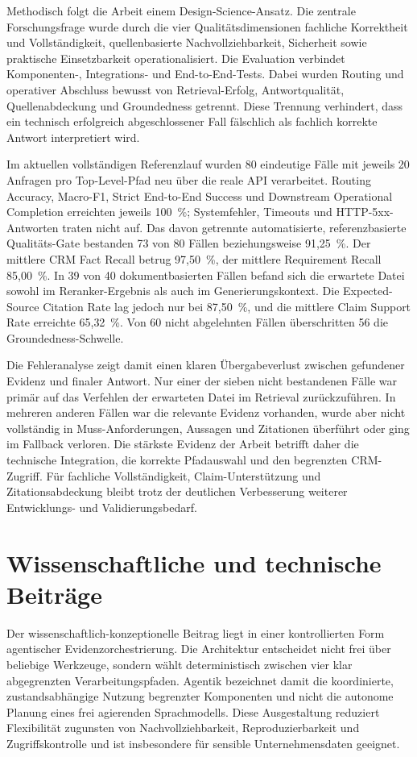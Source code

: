 Methodisch folgt die Arbeit einem Design-Science-Ansatz. Die zentrale Forschungsfrage wurde durch die vier Qualitätsdimensionen fachliche Korrektheit und Vollständigkeit, quellenbasierte Nachvollziehbarkeit, Sicherheit sowie praktische Einsetzbarkeit operationalisiert. Die Evaluation verbindet Komponenten-, Integrations- und End-to-End-Tests. Dabei wurden Routing und operativer Abschluss bewusst von Retrieval-Erfolg, Antwortqualität, Quellenabdeckung und Groundedness getrennt. Diese Trennung verhindert, dass ein technisch erfolgreich abgeschlossener Fall fälschlich als fachlich korrekte Antwort interpretiert wird.

Im aktuellen vollständigen Referenzlauf wurden 80 eindeutige Fälle mit jeweils 20 Anfragen pro Top-Level-Pfad neu über die reale API verarbeitet. Routing Accuracy, Macro-F1, Strict End-to-End Success und Downstream Operational Completion erreichten jeweils 100~\%; Systemfehler, Timeouts und HTTP-5xx-Antworten traten nicht auf. Das davon getrennte automatisierte, referenzbasierte Qualitäts-Gate bestanden 73 von 80 Fällen beziehungsweise 91{,}25~\%. Der mittlere CRM Fact Recall betrug 97{,}50~\%, der mittlere Requirement Recall 85{,}00~\%. In 39 von 40 dokumentbasierten Fällen befand sich die erwartete Datei sowohl im Reranker-Ergebnis als auch im Generierungskontext. Die Expected-Source Citation Rate lag jedoch nur bei 87{,}50~\%, und die mittlere Claim Support Rate erreichte 65{,}32~\%. Von 60 nicht abgelehnten Fällen überschritten 56 die Groundedness-Schwelle.

Die Fehleranalyse zeigt damit einen klaren Übergabeverlust zwischen gefundener Evidenz und finaler Antwort. Nur einer der sieben nicht bestandenen Fälle war primär auf das Verfehlen der erwarteten Datei im Retrieval zurückzuführen. In mehreren anderen Fällen war die relevante Evidenz vorhanden, wurde aber nicht vollständig in Muss-Anforderungen, Aussagen und Zitationen überführt oder ging im Fallback verloren. Die stärkste Evidenz der Arbeit betrifft daher die technische Integration, die korrekte Pfadauswahl und den begrenzten CRM-Zugriff. Für fachliche Vollständigkeit, Claim-Unterstützung und Zitationsabdeckung bleibt trotz der deutlichen Verbesserung weiterer Entwicklungs- und Validierungsbedarf.

\section{Wissenschaftliche und technische Beiträge}

Der wissenschaftlich-konzeptionelle Beitrag liegt in einer kontrollierten Form agentischer Evidenzorchestrierung. Die Architektur entscheidet nicht frei über beliebige Werkzeuge, sondern wählt deterministisch zwischen vier klar abgegrenzten Verarbeitungspfaden. Agentik bezeichnet damit die koordinierte, zustandsabhängige Nutzung begrenzter Komponenten und nicht die autonome Planung eines frei agierenden Sprachmodells. Diese Ausgestaltung reduziert Flexibilität zugunsten von Nachvollziehbarkeit, Reproduzierbarkeit und Zugriffskontrolle und ist insbesondere für sensible Unternehmensdaten geeignet.

